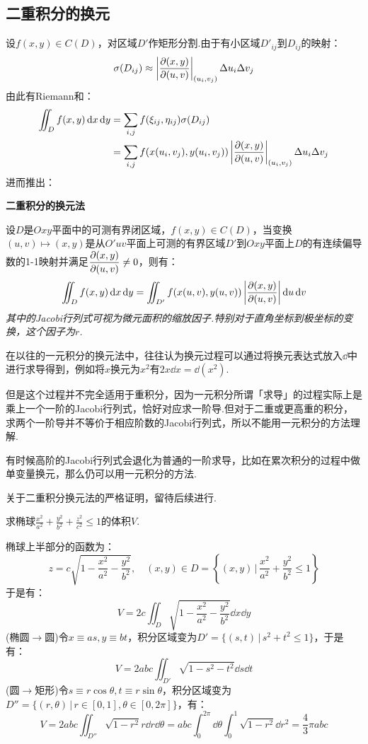 \subsection{二重积分的换元}
设$f(x,y)\in C(D)$，对区域$D'$作矩形分割.由于有小区域$D'_{ij}$到$D_{ij}$的映射：
\[\sigma(D_{ij}) \approx \left|\pdv{(x,y)}{(u,v)}\right|_{(u_i,v_j)} \Delta u_i \Delta v_j\]
由此有Riemann和：
\begin{align*}
    \iint_D f(x,y)\dd{x}\dd{y} &= \sum_{i,j}f(\xi_{ij},\eta_{ij})\sigma(D_{ij}) \\
    &= \sum_{i,j}f(x(u_i,v_j),y(u_i,v_j))\left|\pdv{(x,y)}{(u,v)}\right|_{(u_i,v_j)}\Delta u_i \Delta v_j
\end{align*}
进而推出：
\begin{theorem}
    \textbf{二重积分的换元法}

    设$D$是$Oxy$平面中的可测有界闭区域，$f(x,y)\in C(D)$，当变换$(u,v)\mapsto(x,y)$是从$O'uv$平面上可测的有界区域$D'$到$Oxy$平面上$D$的有连续偏导数的1-1映射并满足$\displaystyle\pdv{(x,y)}{(u,v)}\neq 0$，则有：
    \[\iint_D f(x,y)\dd{x}\dd{y} = \iint_{D'}f(x(u,v),y(u,v))\left|\pdv{(x,y)}{(u,v)}\right|\dd{u}\dd{v}\]
    \textit{其中的Jacobi行列式可视为微元面积的缩放因子.特别对于直角坐标到极坐标的变换，这个因子为$r$.}
\end{theorem}

\begin{mistake}
    在以往的一元积分的换元法中，往往认为换元过程可以通过将换元表达式放入$\dd$中进行求导得到，例如将$x$换元为$x^2$有$2x\dd{x} = \dd{(x^2)}$.

    但是这个过程并不完全适用于重积分，因为一元积分所谓「求导」的过程实际上是乘上一个一阶的Jacobi行列式，恰好对应求一阶导.但对于二重或更高重的积分，求两个一阶导并不等价于相应阶数的Jacobi行列式，所以不能用一元积分的方法理解.

    有时候高阶的Jacobi行列式会退化为普通的一阶求导，比如在累次积分的过程中做单变量换元，那么仍可以用一元积分的方法.
\end{mistake}

关于二重积分换元法的严格证明，留待后续进行.

\begin{question}
    求椭球$\displaystyle\frac{x^2}{a^2} + \frac{y^2}{b^2} + \frac{z^2}{c^2} \leqslant 1$的体积$V$.
\end{question}

\begin{solution}
    椭球上半部分的函数为：
    \[z = c\sqrt{1-\frac{x^2}{a^2}-\frac{y^2}{b^2}},\quad (x,y)\in D = \left\{(x,y)\,\bigg|\,\frac{x^2}{a^2}+\frac{y^2}{b^2}\leqslant 1\right\}\]
    于是有：
    \[V = 2c \iint_D\sqrt{1-\frac{x^2}{a^2}-\frac{y^2}{b^2}}\dd{x}\dd{y}\]
    (椭圆$\to$圆)令$x \equiv as,y \equiv bt$，积分区域变为$D' = \{(s,t)\,|\,s^2+t^2\leqslant 1\}$，于是有：
    \[V = 2abc \iint_{D'}\sqrt{1-s^2-t^2}\dd{s}\dd{t}\]
    (圆$\to$矩形)令$s \equiv r\cos\theta,t \equiv r\sin\theta$，积分区域变为$D'' = \{(r,\theta)\,|\,r\in[0,1],\theta\in[0,2\pi]\}$，有：
    \[V = 2abc\iint_{D''}\sqrt{1-r^2}r\dd{r}\dd{\theta} = abc\int_{0}^{2\pi}\dd{\theta}\int_{0}^{1}\sqrt{1-r^2}\dd{r^2} = \frac{4}{3}\pi abc\]
\end{solution}

